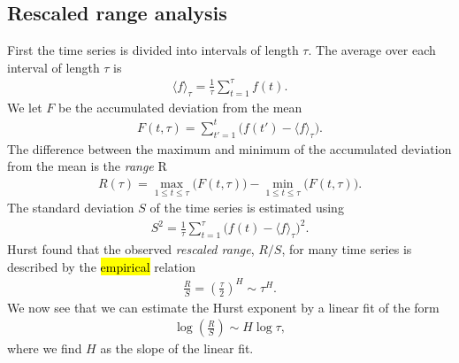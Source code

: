 \subsection{Rescaled range analysis}
First the time series is divided into  intervals of length $\tau$. The average over each interval of length $\tau$ is
\begin{align*}
    \langle f \rangle_\tau = \frac{1}{\tau} \sum_{t=1}^\tau f(t).
\end{align*}
We let $F$ be the accumulated deviation from the mean
\begin{align*}
    F(t, \tau) = \sum_{t' = 1}^t \big( f(t') - \langle f \rangle_\tau \big).
\end{align*}
The difference between the maximum and minimum of the accumulated deviation from the mean is the \emph{range} R
\begin{align*}
    R(\tau) = \max_{1 \leq t \leq \tau} \big(F(t,\tau)\big) - \min_{1 \leq t \leq \tau} \big(F(t, \tau)\big).
\end{align*}
The standard deviation $S$ of the time series is estimated using
\begin{align*}
    S^2 = \frac{1}{\tau} \sum_{t=1}^\tau \big( f(t) - \langle f \rangle_\tau \big)^2.
\end{align*}
Hurst found that the observed \emph{rescaled range}, $R/S$, for many time series is described by the \hl{empirical} relation\cite{feder1988fractals}
\begin{align*}
    \frac{R}{S} = \left(\frac{\tau}{2}\right)^H \sim \tau^H.
\end{align*}
We now see that we can estimate the Hurst exponent by a linear fit of the form
\begin{align*}
    \log \left(\frac{R}{S}\right) \sim H\log\tau,
\end{align*}
where we find $H$ as the slope of the linear fit.


